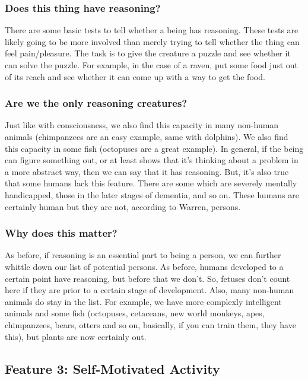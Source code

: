 \subsubsection{Does this thing have reasoning?}

There are some basic tests to tell whether a being has reasoning. These tests are likely going to be more involved than merely trying to tell whether the thing can feel pain/pleasure. The task is to give the creature a puzzle and see whether it can solve the puzzle. For example, in the case of a raven, put some food just out of its reach and see whether it can come up with a way to get the food.  

\subsubsection{Are we the only reasoning creatures?}

Just like with consciousness, we also find this capacity in many non-human animals (chimpanzees are an easy example, same with dolphins). We also find this capacity in some fish (octopuses are a great example). In general, if the being can figure something out, or at least shows that it's thinking about a problem in a more abstract way, then we can say that it has reasoning. But, it's also true that some humans lack this feature. There are some which are severely mentally handicapped, those in the later stages of dementia, and so on. These humans are certainly human but they are not, according to Warren, persons.

\subsubsection{Why does this matter?}

As before, if reasoning is an essential part to being a person, we can further whittle down our list of potential persons. As before, humans developed to a certain point have reasoning, but before that we don't. So, fetuses don't count here if they are prior to a certain stage of development. Also, many non-human animals do stay in the list. For example, we have more complexly intelligent animals and some fish (octopuses, cetaceans, new world monkeys, apes, chimpanzees, bears, otters and so on, basically, if you can train them, they have this), but plants are now certainly out. 

\subsection{Feature 3: Self-Motivated Activity}

